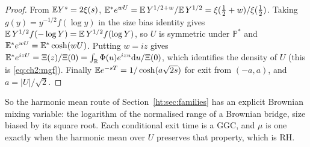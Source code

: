 \begin{proof}
From $\mathbb{E} Y^s=2\xi(s)$, $\mathbb{E}^*e^{wU}=\mathbb{E}\,Y^{1/2+w}/\mathbb{E}\,Y^{1/2}=\xi(\frac12+w)/\xi(\frac12)$. Taking $g(y)=y^{-1/2}f(\log y)$ in the size bias identity gives $\mathbb{E}\,Y^{1/2}f(-\log Y)=\mathbb{E}\,Y^{1/2}f(\log Y)$, so $U$ is symmetric under $\mathbb P^*$ and $\mathbb{E}^*e^{wU}=\mathbb{E}^*\cosh(wU)$. Putting $w=iz$ gives $\mathbb{E}^*e^{izU}=\Xi(z)/\Xi(0)=\int_{\mathbb R}\Phi(u)e^{izu}\mathrm du/\Xi(0)$, which identifies the density of $U$ (this is \eqref{eq:ch2:mgf}). Finally $\mathbb{E} e^{-sT}=1/\cosh(a\sqrt{2s})$ for exit from $(-a,a)$, and $a=|U|/\sqrt2$.
\end{proof}

So the harmonic mean route of Section~\ref{ht:sec:families} has an explicit Brownian mixing variable: the logarithm of the normalised range of a Brownian bridge, size biased by its square root. Each conditional exit time is a GGC, and $\mu$ is one exactly when the harmonic mean over $U$ preserves that property, which is RH.

